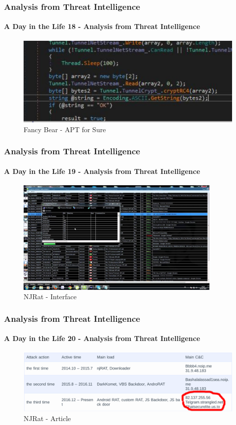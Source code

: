 \documentclass[aspectratio=169]{beamer}
\begin{document}
\begin{frame}
  \frametitle{Analysis from Threat Intelligence}
  \framesubtitle{A Day in the Life 18 - Analysis from Threat Intelligence}
  \begin{center}
    \begin{figure}
      \includegraphics[width=14cm,keepaspectratio]{fancy_bear_analysis_9}
      \caption{Fancy Bear - APT for Sure}
    \end{figure}
  \end{center}
\end{frame}

\begin{frame}
  \frametitle{Analysis from Threat Intelligence}
  \framesubtitle{A Day in the Life 19 - Analysis from Threat Intelligence}
  \begin{center}
    \begin{figure}
      \includegraphics[width=10cm,keepaspectratio]{njrat}
      \caption{NJRat - Interface}
    \end{figure}
  \end{center}
\end{frame}

\begin{frame}
  \frametitle{Analysis from Threat Intelligence}
  \framesubtitle{A Day in the Life 20 - Analysis from Threat Intelligence}
  \begin{center}
    \begin{figure}
      \includegraphics[width=14cm,keepaspectratio]{njrat_article}
      \caption{NJRat - Article}
    \end{figure}
  \end{center}
\end{frame}
\end{document}
